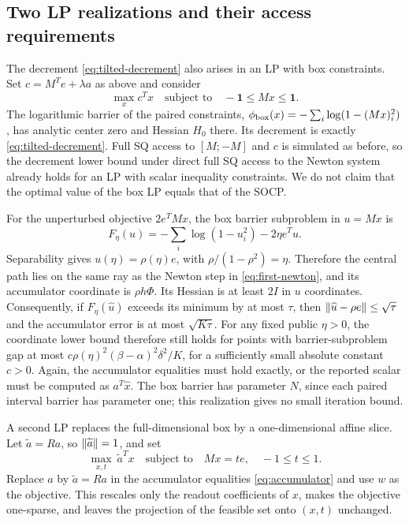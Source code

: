 \subsection{Two LP realizations and their access requirements}

The decrement \eqref{eq:tilted-decrement} also arises in an LP with box
constraints.  Set
$c=M^Te+\lambda a$ as above and consider
\[
 \max_x c^Tx\quad\text{subject to}\quad-\mathbf1\leq Mx\leq\mathbf1.
\]
The logarithmic barrier of the paired constraints,
$\phi_{\rm box}(x)=-\sum_i\log(1-(Mx)_i^2)$, has analytic center zero
and Hessian $H_0$ there.  Its decrement is exactly
\eqref{eq:tilted-decrement}.  Full SQ access to $[M;-M]$ and $c$ is simulated as before,
so the decrement lower bound under direct full SQ access to the Newton
system already holds for an LP with scalar inequality constraints.  We do not claim that
the optimal value of the box LP equals that of the SOCP.

For the unperturbed objective $2e^TMx$, the box barrier subproblem in
$u=Mx$ is
\[
 F_\eta(u)=-\sum_i\log(1-u_i^2)-2\eta e^Tu.
\]
Separability gives $u(\eta)=\rho(\eta)e$, with
$\rho/(1-\rho^2)=\eta$.  Therefore the central path lies on the same ray as the Newton step in
\eqref{eq:first-newton}, and its
accumulator coordinate is $\rho h\Phi$.  Its Hessian is at least $2I$ in
$u$ coordinates.  Consequently, if $F_\eta(\widehat u)$ exceeds its minimum by at most
$\tau$, then
$\left\lVert\widehat u-\rho e\right\rVert\leq\sqrt\tau$ and the accumulator error is
at most $\sqrt{K\tau}$.  For any fixed public $\eta>0$, the coordinate lower bound
therefore still holds for points with barrier-subproblem gap at most
$c\rho(\eta)^2(\beta-\alpha)^2\delta^2/K$, for a sufficiently small
absolute constant $c>0$.  Again, the accumulator equalities must hold
exactly, or the reported scalar must be computed as $a^T\widehat x$.
The box barrier has parameter $N$, since each paired interval barrier
has parameter one; this realization gives no small iteration bound.

A second LP replaces the full-dimensional box by a one-dimensional
affine slice.  Let $\widetilde a=Ra$, so $\left\lVert\widetilde a\right\rVert=1$, and set
\begin{equation}\label{eq:affine-lp}
 \max_{x,t}\ \widetilde a^Tx
 \quad\text{subject to}\quad Mx=te,\quad-1\leq t\leq1.
\end{equation}
Replace $a$ by $\widetilde a=Ra$ in the accumulator equalities
\eqref{eq:accumulator} and use $w$ as the objective.  This rescales only
the readout coefficients of $x$, makes the objective one-sparse, and
leaves the projection of the feasible set onto $(x,t)$ unchanged.

